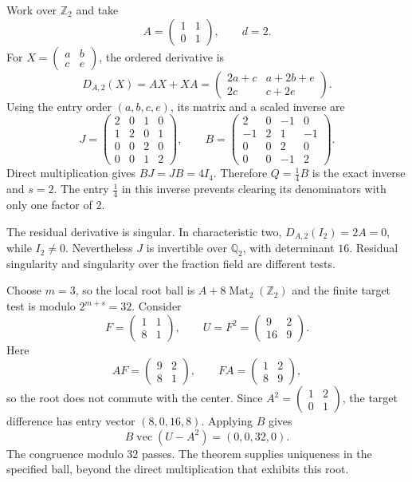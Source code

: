Work over $\mathbb Z_2$ and take
\[
 A=\begin{pmatrix}1&1\\0&1\end{pmatrix},\qquad d=2.
\]
For $X=\begin{pmatrix}a&b\\c&e\end{pmatrix}$, the ordered derivative is
\[
 D_{A,2}(X)=AX+XA
 =\begin{pmatrix}2a+c&a+2b+e\\2c&c+2e\end{pmatrix}.
\]
Using the entry order $(a,b,c,e)$, its matrix and a scaled inverse are
\[
 J=\begin{pmatrix}
 2&0&1&0\\1&2&0&1\\0&0&2&0\\0&0&1&2
 \end{pmatrix},\qquad
 B=\begin{pmatrix}
 2&0&-1&0\\-1&2&1&-1\\0&0&2&0\\0&0&-1&2
 \end{pmatrix}.
\]
Direct multiplication gives $BJ=JB=4I_4$. Therefore $Q=\tfrac14 B$
is the exact inverse and $s=2$. The entry $\tfrac14$ in this inverse
prevents clearing its denominators with only one factor of $2$.

The residual derivative is singular. In characteristic two,
$D_{A,2}(I_2)=2A=0$, while $I_2\ne0$. Nevertheless $J$ is invertible
over $\mathbb Q_2$, with determinant $16$. Residual singularity and
singularity over the fraction field are different tests.

Choose $m=3$, so the local root ball is $A+8\operatorname{Mat}_2(\mathbb Z_2)$
and the finite target test is modulo $2^{m+s}=32$. Consider
\[
 F=\begin{pmatrix}1&1\\8&1\end{pmatrix},\qquad
 U=F^2=\begin{pmatrix}9&2\\16&9\end{pmatrix}.
\]
Here
\[
 AF=\begin{pmatrix}9&2\\8&1\end{pmatrix},\qquad
 FA=\begin{pmatrix}1&2\\8&9\end{pmatrix},
\]
so the root does not commute with the center. Since
$A^2=\begin{pmatrix}1&2\\0&1\end{pmatrix}$, the target difference has
entry vector $(8,0,16,8)$. Applying $B$ gives
\[
 B\operatorname{vec}(U-A^2)=(0,0,32,0).
\]
The congruence modulo $32$ passes. The theorem supplies uniqueness in the
specified ball, beyond the direct multiplication that exhibits this root.

